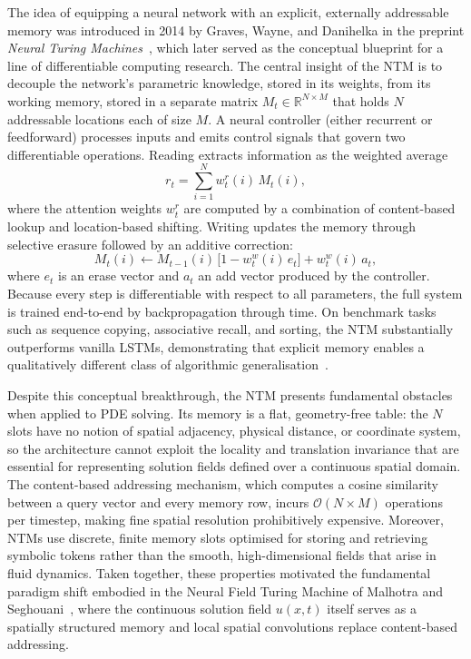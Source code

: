 The idea of equipping a neural network with an explicit, externally addressable memory was introduced in 2014 by Graves, Wayne, and Danihelka in the preprint \emph{Neural Turing Machines}~\cite{graves2014neural}, which later served as the conceptual blueprint for a line of differentiable computing research. The central insight of the NTM is to decouple the network's parametric knowledge, stored in its weights, from its working memory, stored in a separate matrix $M_t \in \mathbb{R}^{N \times M}$ that holds $N$ addressable locations each of size $M$. A neural controller (either recurrent or feedforward) processes inputs and emits control signals that govern two differentiable operations. Reading extracts information as the weighted average
\begin{equation}
  r_t = \sum_{i=1}^{N} w_t^r(i)\, M_t(i),
\end{equation}
where the attention weights $w_t^r$ are computed by a combination of content-based lookup and location-based shifting. Writing updates the memory through selective erasure followed by an additive correction:
\begin{equation}
  M_t(i) \leftarrow M_{t-1}(i)\,\bigl[1 - w_t^w(i)\, e_t\bigr] + w_t^w(i)\, a_t,
\end{equation}
where $e_t$ is an erase vector and $a_t$ an add vector produced by the controller. Because every step is differentiable with respect to all parameters, the full system is trained end-to-end by backpropagation through time. On benchmark tasks such as sequence copying, associative recall, and sorting, the NTM substantially outperforms vanilla LSTMs, demonstrating that explicit memory enables a qualitatively different class of algorithmic generalisation~\cite{graves2014neural}.

Despite this conceptual breakthrough, the NTM presents fundamental obstacles when applied to PDE solving. Its memory is a flat, geometry-free table: the $N$ slots have no notion of spatial adjacency, physical distance, or coordinate system, so the architecture cannot exploit the locality and translation invariance that are essential for representing solution fields defined over a continuous spatial domain. The content-based addressing mechanism, which computes a cosine similarity between a query vector and every memory row, incurs $\mathcal{O}(N \times M)$ operations per timestep, making fine spatial resolution prohibitively expensive. Moreover, NTMs use discrete, finite memory slots optimised for storing and retrieving symbolic tokens rather than the smooth, high-dimensional fields that arise in fluid dynamics. Taken together, these properties motivated the fundamental paradigm shift embodied in the Neural Field Turing Machine of Malhotra and Seghouani~\cite{malhotra2025neuralfieldturingmachine}, where the continuous solution field $u(x,t)$ itself serves as a spatially structured memory and local spatial convolutions replace content-based addressing.

